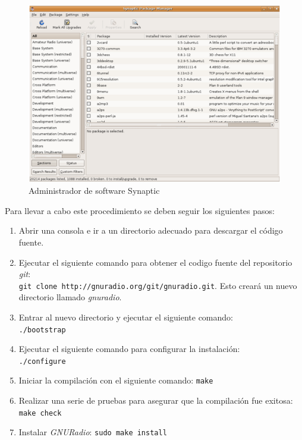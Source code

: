 \begin{figure}
\centering
	\includegraphics[scale=0.7]{figs/synaptic}
	\vspace{0.1in}
	\caption{Administrador de software Synaptic}
	\label{fig:synaptic}
\end{figure}

Para llevar a cabo este procedimiento se deben seguir los siguientes pasos:

\begin{enumerate}
  \item Abrir una consola e ir a un directorio adecuado para descargar el
  c\'odigo fuente.
  \item Ejecutar el siguiente comando para obtener el codigo fuente del repositorio \emph{git}:\\
  \verb|git clone http://gnuradio.org/git/gnuradio.git|. Esto crear\'a un nuevo
  directorio llamado \emph{gnuradio}.
  \item Entrar al nuevo directorio y ejecutar el siguiente comando:\\
  \verb|./bootstrap|
  \item Ejecutar el siguiente comando para configurar la instalaci\'on:\\
  \verb|./configure|
  \item Iniciar la compilaci\'on con el siguiente comando: \verb|make|
  \item Realizar una serie de pruebas para asegurar que la compilaci\'on fue
  exitosa:\\
  \verb|make check|
  \item Instalar \emph{GNURadio}: \verb|sudo make install|
\end{enumerate}

